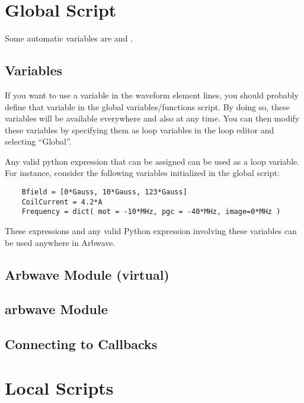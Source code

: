 \section{Global Script}
    Some automatic variables are  and .

  \subsection{Variables} \label{script:variables}
    If you want to use a variable in the waveform element lines, you should
    probably define that variable in the global variables/functions script.  By
    doing so, these variables will be available everywhere and also at any time.
    You can then modify these variables by specifying them as loop variables in
    the loop editor and selecting ``Global''.

    Any valid python expression that can be assigned can be used as a loop
    variable.  For instance, consider the following variables initialized in the
    global script:

    \begin{verbatim}
    Bfield = [0*Gauss, 10*Gauss, 123*Gauss]
    CoilCurrent = 4.2*A
    Frequency = dict( mot = -10*MHz, pgc = -40*MHz, image=0*MHz )
    \end{verbatim}

    These expressions and any valid Python expression involving these variables
    can be used anywhere in Arbwave.

  \subsection{\textbf{Arbwave} Module (virtual)}
  \subsection{\textbf{arbwave} Module}
  \subsection{Connecting to Callbacks}

\section{Local Scripts}
